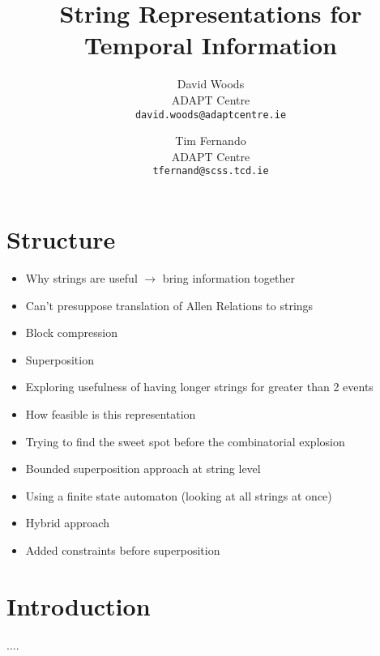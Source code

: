 \documentclass[a4paper,11pt]{article}
\title{String Representations for Temporal Information}
\date{}
\author{David Woods\\
       ADAPT Centre\\
       \texttt{david.woods@adaptcentre.ie}
  \and Tim Fernando\\
       ADAPT Centre\\
       \texttt{tfernand@scss.tcd.ie}
}
\begin{document}
\maketitle
\thispagestyle{empty}
\pagestyle{empty}

\section{Structure}

\begin{itemize}
	\item Why strings are useful $\to$ bring information together
	\item Can't presuppose translation of Allen Relations to strings
	\item Block compression
	\item Superposition
	\item Exploring usefulness of having longer strings for greater than 2 
	events
	\item How feasible is this representation
	\item Trying to find the sweet spot before the combinatorial explosion
	\item Bounded superposition approach at string level
	\item Using a finite state automaton (looking at all strings at once)
	\item Hybrid approach
	\item Added constraints before superposition
\end{itemize}

\section{Introduction}

....



\end{document}
